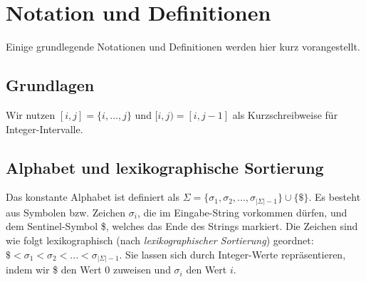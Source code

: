 \section{Notation und Definitionen}
Einige grundlegende Notationen und Definitionen werden hier kurz vorangestellt.

\subsection{Grundlagen}
Wir nutzen $[i, j] = \{i, \dots, j\}$ und $[i, j) = [i, j - 1]$ als Kurzschreibweise für Integer-Intervalle.

\subsection{Alphabet und lexikographische Sortierung}
Das konstante Alphabet ist definiert als $\Sigma = \{\sigma_1, \sigma_2, ..., \sigma_{|\Sigma|-1}\} \cup \{\$\}$.
 Es besteht aus Symbolen bzw. Zeichen $\sigma_i$, die im Eingabe-String vorkommen dürfen, und dem Sentinel-Symbol \$, welches das Ende des Strings markiert. 
 Die Zeichen sind wie folgt lexikographisch (nach \textit{lexikographischer Sortierung})
geordnet: $\$ < \sigma_1 < \sigma_2 < ... < \sigma_{|\Sigma|-1}$. 
Sie lassen sich durch Integer-Werte repräsentieren, indem wir \$ den Wert 0 zuweisen und $\sigma_i$ den Wert $i$.

